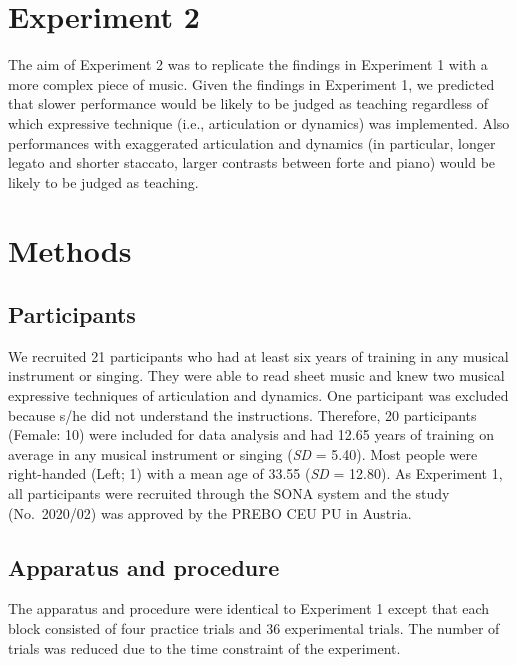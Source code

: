 \documentclass[
  man,floatsintext]{apa6}
\begin{document}
\clearpage

\hypertarget{experiment-2}{%
\section{Experiment 2}\label{experiment-2}}

The aim of Experiment 2 was to replicate the findings in Experiment 1 with a more complex piece of music. Given the findings in Experiment 1, we predicted that slower performance would be likely to be judged as teaching regardless of which expressive technique (i.e., articulation or dynamics) was implemented. Also performances with exaggerated articulation and dynamics (in particular, longer legato and shorter staccato, larger contrasts between forte and piano) would be likely to be judged as teaching.

\hypertarget{methods-1}{%
\section{Methods}\label{methods-1}}

\hypertarget{participants-1}{%
\subsection{Participants}\label{participants-1}}

We recruited 21 participants who had at least six years of training in any musical instrument or singing. They were able to read sheet music and knew two musical expressive techniques of articulation and dynamics. One participant was excluded because s/he did not understand the instructions. Therefore, 20 participants (Female: 10) were included for data analysis and had 12.65 years of training on average in any musical instrument or singing (\emph{SD} = 5.40). Most people were right-handed (Left; 1) with a mean age of 33.55 (\emph{SD} = 12.80). As Experiment 1, all participants were recruited through the SONA system and the study (No.~2020/02) was approved by the PREBO CEU PU in Austria.

\hypertarget{apparatus-and-procedure}{%
\subsection{Apparatus and procedure}\label{apparatus-and-procedure}}

The apparatus and procedure were identical to Experiment 1 except that each block consisted of four practice trials and 36 experimental trials. The number of trials was reduced due to the time constraint of the experiment.
\end{document}
